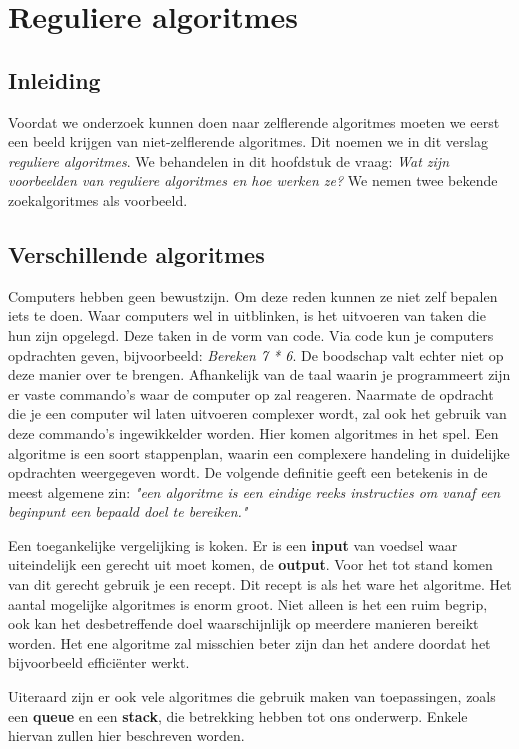 
\section{Reguliere algoritmes}

\subsection{Inleiding}
Voordat we onderzoek kunnen doen naar zelflerende algoritmes moeten we eerst een beeld krijgen van niet-zelflerende algoritmes. Dit noemen we in dit verslag \textit{reguliere algoritmes}. We behandelen in dit hoofdstuk de vraag: \textit{Wat zijn voorbeelden van reguliere algoritmes en hoe werken ze?} We nemen twee bekende zoekalgoritmes als voorbeeld.


\subsection{Verschillende algoritmes}
Computers hebben geen bewustzijn. Om deze reden kunnen ze niet zelf bepalen iets te doen. Waar computers wel in uitblinken, is het uitvoeren van taken die hun zijn opgelegd. Deze taken in de vorm van code. Via code kun je computers opdrachten geven, bijvoorbeeld: \textit{Bereken 7 * 6}. De boodschap valt echter niet op deze manier over te brengen. Afhankelijk van de taal waarin je programmeert zijn er vaste commando's waar de computer op zal reageren.
Naarmate de opdracht die je een computer wil laten uitvoeren complexer wordt, zal ook het gebruik van deze commando's ingewikkelder worden. Hier komen algoritmes in het spel. Een algoritme is een soort stappenplan, waarin een complexere handeling in duidelijke opdrachten weergegeven wordt. De volgende definitie geeft een betekenis in de meest algemene zin: \textit{"een algoritme is een eindige reeks instructies om vanaf een beginpunt een bepaald doel te bereiken."} \cite{WoordenOrg}

Een toegankelijke vergelijking is koken. Er is een \textbf{input} van voedsel waar uiteindelijk een gerecht uit moet komen, de \textbf{output}. Voor het tot stand komen van dit gerecht gebruik je een recept. Dit recept is als het ware het algoritme.
Het aantal mogelijke algoritmes is enorm groot. Niet alleen is het een ruim begrip, ook kan het desbetreffende doel waarschijnlijk op meerdere manieren bereikt worden. Het ene algoritme zal misschien beter zijn dan het andere doordat het bijvoorbeeld effici\"enter werkt.

Uiteraard zijn er ook vele algoritmes die gebruik maken van toepassingen, zoals een \textbf{queue} en een \textbf{stack}, die betrekking hebben tot ons onderwerp. Enkele hiervan zullen hier beschreven worden.

